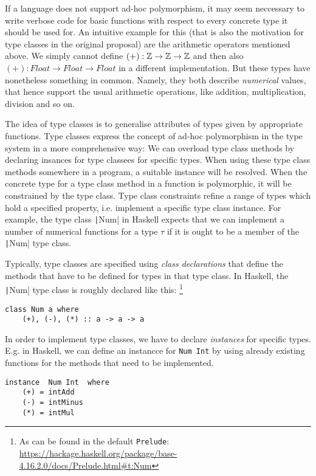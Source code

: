 If a language does not support ad-hoc polymorphism, it may seem neccessary to write verbose code for basic functions with respect to every concrete type it should be used for.
An intuitive example for this (that is also the motivation for type classes in the original proposal) are the arithmetic operators mentioned above.
We simply cannot define $(+) : \mathbb{Z} \to \mathbb{Z} \to \mathbb{Z}$ and then also $(+) : \mathit{Float} \to \mathit{Float} \to \mathit{Float}$ in a different implementation.
But these types have nonetheless something in common.
Namely, they both describe \emph{numerical} values, that hence support the usual arithmetic operations, like addition, multiplication, division and so on.

The idea of type classes is to generalise attributes of types given by appropriate functions.
Type classes express the concept of ad-hoc polymorphism in the type system in a more comprehensive way:
We can overload type class methods by declaring insances for type classees for specific types.
When using these type class methods somewhere in a program, a suitable instance will be resolved.
When the concrete type for a type class method in a function is polymorphic, it will be constrained by the type class.
Type class constraints refine a range of types which hold a specified property, i.e. implement a specific type class instance.
For example, the type class \texttt|Num| in Haskell expects that we can implement a number of numerical functions for a type $\tau$ if it is ought to be a member of the \texttt|Num| type class.

Typically, type classes are specified using \emph{class declarations} that define the methods that have to be defined for types in that type class.
In Haskell, the \texttt|Num| type class is roughly declared like this:
\footnote{As can be found in the default \texttt{Prelude}: \url{https://hackage.haskell.org/package/base-4.16.2.0/docs/Prelude.html\#t:Num}}

\begin{verbatim}
class Num a where
    (+), (-), (*) :: a -> a -> a
\end{verbatim}

In order to implement type classes, we have to declare \emph{instances} for specific types.
E.g. in Haskell, we can define an instancce for \texttt{Num Int} by using already existing functions for the methods that need to be implemented.

\begin{verbatim}
instance  Num Int  where
    (+) = intAdd
    (-) = intMinus
    (*) = intMul
\end{verbatim}

